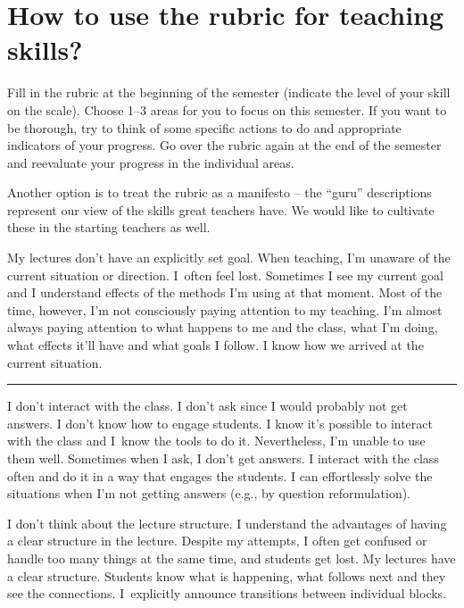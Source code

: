 \section*{How to use the rubric for teaching skills?}

Fill in the rubric at the beginning of the semester (indicate the level of your skill on the scale). Choose 1--3 areas for you to focus on this semester. If you want to be thorough, try to think of some specific actions to do and appropriate indicators of your progress. Go over the rubric again at the end of the semester and reevaluate your progress in the individual areas.

Another option is to treat the rubric as a manifesto -- the \enquote{guru} descriptions represent our view of the skills great teachers have. We would like to cultivate these in the starting teachers as well.


\newpage
{}
{My lectures don't have an explicitly set goal. When teaching, I'm unaware of the current situation or direction. I~often feel lost.}
{Sometimes I see my current goal and I understand effects of the methods I'm using at that moment. Most of the time, however, I'm not consciously paying attention to my teaching.}
{I'm almost always paying attention to what happens to me and the class, what I'm doing, what effects it'll have and what goals I follow. I know how we arrived at the current situation.}

\rule{\textwidth}{0.4pt}
{I don't interact with the class. I don't ask since I would probably not get answers. I don't know how to engage students.}
{I know it's possible to interact with the class and I~know the tools to do it. Nevertheless, I'm unable to use them well. Sometimes when I ask, I don't get answers.}
{I interact with the class often and do it in a way that engages the students. I can effortlessly solve the situations when I'm not getting answers (e.g., by question reformulation).}

\newpage
{}
{I don't think about the lecture structure.}
{I understand the advantages of having a clear structure in the lecture. Despite my attempts, I often get confused or handle too many things at the same time, and students get lost.}
{My lectures have a clear structure. Students know what is happening, what follows next and they see the connections. I~explicitly announce transitions between individual blocks.}

